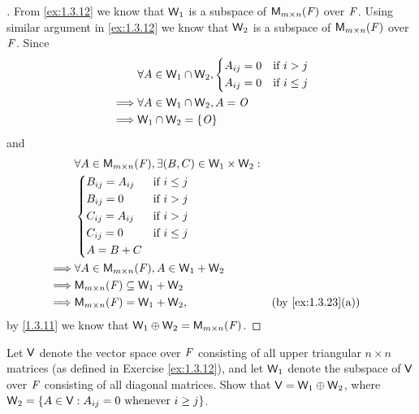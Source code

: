 \begin{proof}[]
	From \cref{ex:1.3.12} we know that \(\mathsf{W}_1\) is a subspace of \(\MS\) over \(\mathit{F}\).
	Using similar argument in \cref{ex:1.3.12} we know that \(\mathsf{W}_2\) is a subspace of \(\MS\) over \(\mathit{F}\).
	Since
	\begin{align*}
		         & \forall A \in \mathsf{W}_1 \cap \mathsf{W}_2, \begin{dcases}
			                                         A_{i j} = 0 & \text{if } i > j    \\
			                                         A_{i j} = 0 & \text{if } i \leq j
		                                         \end{dcases} \\
		\implies & \forall A \in \mathsf{W}_1 \cap \mathsf{W}_2, A = \mathit{O}                           \\
		\implies & \mathsf{W}_1 \cap \mathsf{W}_2 = \left\lbrace\mathit{O}\right\rbrace
	\end{align*}
	and
	\begin{align*}
		         & \forall A \in \MS, \exists (B, C) \in \W_1 \times \W_2 :                        \\
		         & \begin{dcases}
			           B_{i j} = A_{i j} & \text{if } i \leq j \\
			           B_{i j} = 0       & \text{if } i > j    \\
			           C_{i j} = A_{i j} & \text{if } i > j    \\
			           C_{i j} = 0       & \text{if } i \leq j \\
			           A = B + C
		           \end{dcases}                                         \\
		\implies & \forall A \in \MS, A \in \W_1 + \W_2                                            \\
		\implies & \MS \subseteq \W_1 + \W_2                                                       \\
		\implies & \MS = \W_1 + \W_2,                                       &  & \by{ex:1.3.23}[a]
	\end{align*}
	by \cref{1.3.11} we know that \(\W_1 \oplus \W_2 = \MS\).
\end{proof}

\begin{ex}\label{ex:1.3.27}
	Let \(\mathsf{V}\) denote the vector space over \(\mathit{F}\) consisting of all upper triangular \(n \times n\) matrices (as defined in Exercise \cref{ex:1.3.12}), and let \(\mathsf{W}_1\) denote the subspace of \(\mathsf{V}\) over \(\mathit{F}\) consisting of all diagonal matrices.
	Show that \(\mathsf{V} = \mathsf{W}_1 \oplus \mathsf{W}_2\), where \(\mathsf{W}_2 = \left\lbrace A \in \mathsf{V} : A_{i j} = 0 \text{ whenever } i \geq j\right\rbrace\).
\end{ex}

